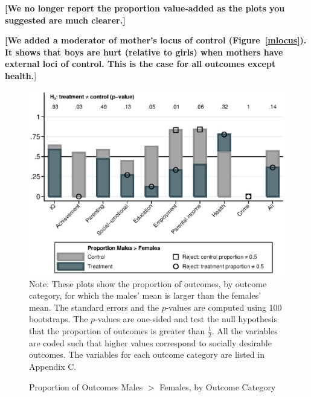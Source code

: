 \textbf{[We no longer report the proportion value-added as the plots you suggested are much clearer.]}

\textbf{[We added a moderator of mother's locus of control (Figure~\ref{mlocus}). It shows that boys are hurt (relative to girls) when mothers have external loci of control. This is the case for all outcomes except health.}]

\begin{figure}
\centering
\caption{Proportion of Outcomes Males $>$ Females, by Outcome Category}
\label{fig:proportion}
	\includegraphics[width=\textwidth]{output/gendergaps-treat-vs-fullcontrol}
\footnotesize \justify
Note: These plots show the proportion of outcomes, by outcome category, for which the males' mean is larger than the females' mean. The standard errors and the $p$-values are computed using 100 bootstraps. The $p$-values are one-sided and test the null hypothesis that the proportion of outcomes is greater than $\frac{1}{2}$. All the variables are coded such that higher values correspond to socially desirable outcomes. The variables for each outcome category are listed in Appendix C.
\end{figure}

